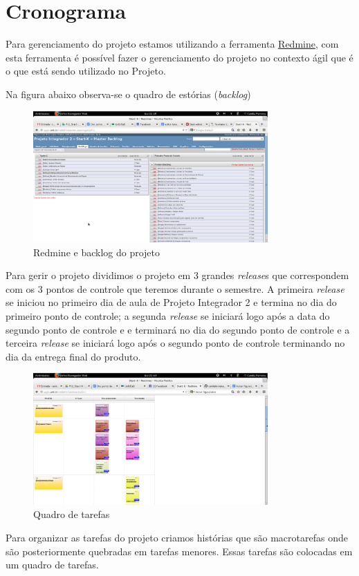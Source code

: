 \chapter[Cronograma]{Cronograma}

Para gerenciamento do projeto estamos utilizando a ferramenta \href{http://lappis.unb.br/redm}{Redmine}, com esta ferramenta é possível fazer o gerenciamento do projeto no contexto ágil que é o que está sendo utilizado no Projeto.

Na figura abaixo observa-se o quadro de estórias (\textit{backlog})
\begin{figure}[h]
  \centering
  \includegraphics[width=0.8\textwidth]
      {figuras/backlogs.eps}
  \caption{Redmine e backlog do projeto}
  \label{redmine-backlog}
\end{figure}


Para gerir o projeto dividimos o projeto em 3 grandes \textit{release}s que correspondem com os 3 pontos de controle que teremos durante o semestre. A primeira \textit{release} se iniciou no primeiro dia de aula de Projeto Integrador 2 e termina no dia do primeiro ponto de controle; a segunda \textit{release} se iniciará logo após a data do segundo ponto de controle e e terminará no dia do segundo ponto de controle e a terceira \textit{release} se iniciará logo após o segundo ponto de controle terminando no dia da entrega final do produto.

\begin{figure}[h]
  \centering
  \includegraphics[width=0.8\textwidth]
      {figuras/quadrotarefas.eps}
  \caption{Quadro de tarefas}
  \label{quadro-de-tarefas}
\end{figure}
Para organizar as tarefas do projeto criamos histórias que são macrotarefas onde são posteriormente quebradas em tarefas menores. Essas tarefas são colocadas em um quadro de tarefas.


  
